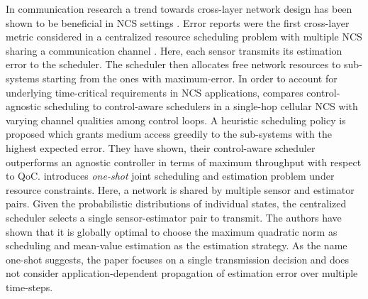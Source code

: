 In communication research a trend towards cross-layer network design has been
shown to be beneficial in NCS settings \cite{park2017wireless}. Error reports
were the first cross-layer metric considered in a centralized resource
scheduling problem with multiple NCS sharing a communication channel
\cite{walsh2001scheduling}. Here, each sensor transmits its estimation error to
the scheduler. The scheduler then allocates free network resources to
sub-systems starting from the ones with maximum-error. In order to account for
underlying time-critical requirements in NCS applications,
\cite{vilgelm2017control} compares control-agnostic scheduling to control-aware
schedulers in a single-hop cellular NCS with varying channel qualities among
control loops. A heuristic scheduling policy is proposed which grants medium
access greedily to the sub-systems with the highest expected error. They have
shown, their control-aware scheduler outperforms an agnostic controller in terms
of maximum throughput with respect to QoC. \cite{vasconcelos2017optimal}
introduces \textit{one-shot} joint scheduling and estimation problem under
resource constraints. Here, a network is shared by multiple sensor and estimator
pairs. Given the probabilistic distributions of individual states, the
centralized scheduler selects a single sensor-estimator pair to transmit. The
authors have shown that it is globally optimal to choose the maximum quadratic
norm as scheduling and mean-value estimation as the estimation strategy. As the
name one-shot suggests, the paper focuses on a single transmission decision and
does not consider application-dependent propagation of estimation error over
multiple time-steps.

